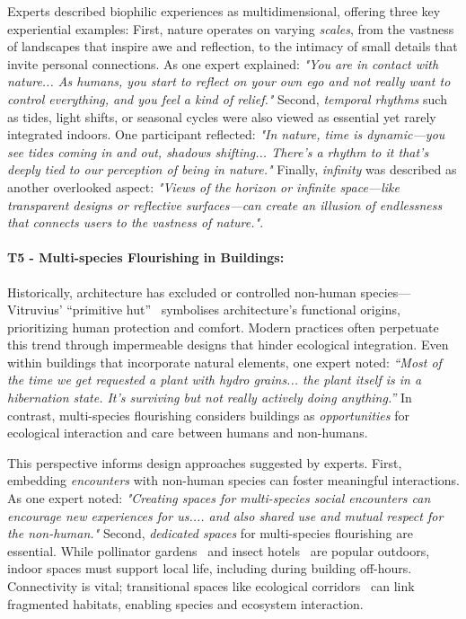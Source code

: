 Experts described biophilic experiences as multidimensional, offering three key experiential examples: First, nature operates on varying \emph{scales}, from the vastness of landscapes that inspire awe and reflection, to the intimacy of small details that invite personal connections. As one expert explained: \textit{"You are in contact with nature... As humans, you start to reflect on your own ego and not really want to control everything, and you feel a kind of relief."} Second, \emph{temporal rhythms} such as tides, light shifts, or seasonal cycles were also viewed as essential yet rarely integrated indoors. One participant reflected: \textit{"In nature, time is dynamic---you see tides coming in and out, shadows shifting... There’s a rhythm to it that’s deeply tied to our perception of being in nature."} Finally, \emph{infinity} was described as another overlooked aspect: \textit{"Views of the horizon or infinite space---like transparent designs or reflective surfaces---can create an illusion of endlessness that connects users to the vastness of nature."}. 


\paragraph{T5 - Multi-species Flourishing in Buildings:}
\label{theme:t5}
Historically, architecture has excluded or controlled non-human species---Vitruvius’ ``primitive hut''~\cite{laugier1755essay, topccuouglu2022architecture} symbolises architecture’s functional origins, prioritizing human protection and comfort. Modern practices often perpetuate this trend through impermeable designs that hinder ecological integration. Even within buildings that incorporate natural elements, one expert noted: \textit{“Most of the time we get requested a plant with hydro grains... the plant itself is in a hibernation state. It’s surviving but not really actively doing anything.”} In contrast, multi-species flourishing considers buildings as \emph{opportunities} for ecological interaction and care between humans and non-humans.

This perspective informs design approaches suggested by experts. First, embedding \emph{encounters} with non-human species can foster meaningful interactions. As one expert noted: \textit{"Creating spaces for multi-species social encounters can encourage new experiences for us.... and also shared use and mutual respect for the non-human."} Second, \emph{dedicated spaces} for multi-species flourishing are essential. While pollinator gardens~\cite{wenzel2020urbanization} and insect hotels~\cite{james2019urbanisation} are popular outdoors, indoor spaces must support local life, including during building off-hours. Connectivity is vital; transitional spaces like ecological corridors~\cite{zellmer2022urban} can link fragmented habitats, enabling species and ecosystem interaction. 

